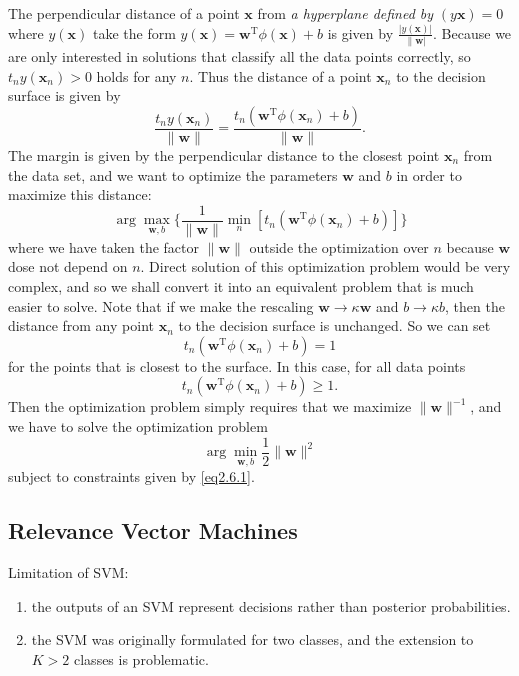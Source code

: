 \documentclass[a4paper]{book}
\newcommand{\mrm}{\mathrm}
\newcommand{\mbf}{\mathbf}
\newcommand{\ww}{\mbf w}
\newcommand{\xx}{\mbf x}
\newcommand{\rev}{^{-1}}
\newcommand{\trans}{^{\mrm T}}
\begin{document}
The perpendicular distance of a point $\xx$ from \textit{a hyperplane defined by} $ (y\xx) = 0$ where $y(\xx)$ take the form $y(\xx)=\ww\trans\phi(\xx)+b$ is given by $\frac{|y(\xx)|}{\|\ww|}$. Because we are only interested in solutions that classify all the data points correctly, so $t_ny(\xx_n)>0$ holds for any $n$. Thus the distance of a point $\xx_n$ to the decision surface is  given by
\begin{equation}\label{}
  \frac{t_ny(\xx_n)}{\|\ww\|}=\frac{t_n(\ww\trans\phi(\xx_n)+b)}{\|\ww\|}.
\end{equation}
The margin is given by the perpendicular distance to the closest point $\xx_n$ from the data set, and we want to optimize the parameters $\ww$ and $b$ in order to maximize this distance:
\begin{equation}\label{}
  \arg\max_{\ww,b}\{\frac1{\|\ww\|}\min_n[t_n(\ww\trans\phi(\xx_n)+b)]\}
\end{equation}
where we have taken the factor $\|\ww\|$ outside the optimization over $n$ because $\ww$ dose not depend on $n$. Direct solution of this optimization problem would be very
complex, and so we shall convert it into an equivalent problem that is much easier to solve. Note that if we make the rescaling $\ww \rightarrow \kappa\ww$ and $b\rightarrow \kappa b$, then the distance from any point $\xx_n$ to the decision surface is unchanged. So we can set
\begin{equation}\label{}
  t_n(\ww\trans\phi(\xx_n)+b) = 1
\end{equation}
for the points that is closest to the surface. In this case, for all data points
\begin{equation}\label{eq2.6.1}
  t_n(\ww\trans\phi(\xx_n)+b)\geq 1.
\end{equation}
Then the optimization problem simply requires that we maximize $\|\ww\|\rev$, and we have to solve the optimization problem
\begin{equation}\label{}
  \arg\min_{\ww,b}\frac12\|\ww\|^2
\end{equation}
subject to constraints given by \ref{eq2.6.1}.



\subsection{Relevance Vector Machines}
Limitation of SVM:
\begin{enumerate}
  \item the outputs of an SVM represent decisions rather than posterior probabilities.
  \item  the SVM was originally formulated for two classes, and the extension to $K > 2$ classes is problematic.
\end{enumerate}
\end{document}
